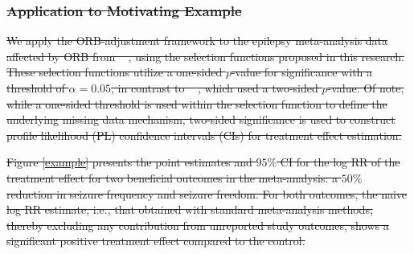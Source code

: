 \documentclass[twocolumn]{article}\usepackage[]{graphicx}\usepackage[]{xcolor}
\providecommand{\DIFdeltex}[1]{{\protect\color{red}\sout{#1}}}                      %
\providecommand{\DIFdelbegin}{} %
\providecommand{\DIFdelend}{} %
\providecommand{\DIFdel}[1]{\texorpdfstring{\DIFdeltex{#1}}{}} %
\newcommand{\DIFscaledelfig}{0.5}
\newlength{\DIFdelgraphicswidth} %
\newlength{\DIFdelgraphicsheight} %
\newcommand{\DIFdelincludegraphics}[2][]{%
\sbox{\DIFdelgraphicsbox}{\DIFOincludegraphics[#1]{#2}}%
\settoboxwidth{\DIFdelgraphicswidth}{\DIFdelgraphicsbox} %
\settoboxtotalheight{\DIFdelgraphicsheight}{\DIFdelgraphicsbox} %
\scalebox{\DIFscaledelfig}{%
\parbox[b]{\DIFdelgraphicswidth}{\usebox{\DIFdelgraphicsbox}\\[-\baselineskip] \rule{\DIFdelgraphicswidth}{0em}}\llap{\resizebox{\DIFdelgraphicswidth}{\DIFdelgraphicsheight}{%
\setlength{\unitlength}{\DIFdelgraphicswidth}%
\begin{picture}(1,1)%
\thicklines\linethickness{2pt} %
{\color[rgb]{1,0,0}\put(0,0){\framebox(1,1){}}}%
{\color[rgb]{1,0,0}\put(0,0){\line( 1,1){1}}}%
{\color[rgb]{1,0,0}\put(0,1){\line(1,-1){1}}}%
\end{picture}%
}\hspace*{3pt}}} %
} %
\DeclareRobustCommand{\DIFdelbegin}{\DIFOdelbegin \let\includegraphics\DIFdelincludegraphics} %
\DeclareRobustCommand{\DIFdelend}{\DIFOaddend \let\includegraphics\DIFOincludegraphics} %
\begin{document}
\DIFdelbegin \subsubsection{\DIFdel{Application to Motivating Example}}
\addtocounter{subsubsection}{-1}%
\DIFdelend %

\DIFdelbegin \DIFdel{We apply the ORB-adjustment framework to the epilepsy meta-analysis data affected by ORB from \mbox{%
\citet{topiramate, Copas2019}}\hskip0pt%
, using the selection functions proposed in this research. These selection functions utilize a one-sided $p$-value for significance with a threshold of $\alpha=0.05$, in contrast to \mbox{%
\citet{Copas2019}}\hskip0pt%
, which used a two-sided $p$-value. Of note, while a one-sided threshold is used within the selection function to define the underlying missing data mechanism, two-sided significance is used to construct profile likelihood (PL) confidence intervals (CIs) for treatment effect estimation. }%

\DIFdel{Figure \ref{example} presents the point estimates and $95\%$ CI for the log RR of the treatment effect for two beneficial outcomes in the meta-analysis: a $50\%$ reduction in seizure frequency and seizure freedom. For both outcomes, the naive log RR estimate, i.e., that obtained with standard meta-analysis methods, thereby excluding any contribution from unreported study outcomes, shows a significant positive treatment effect compared to the control. }%
\end{document}
